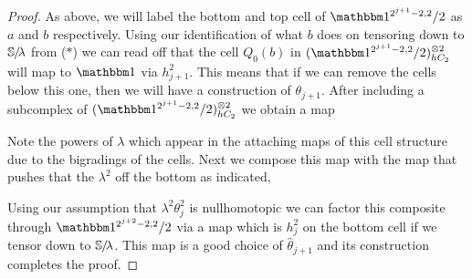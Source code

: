 \begin{proof}
  As above, we will label the bottom and top cell of $\o^{2^{j+1}-2,2}/2$ as $a$ and $b$ respectively.
  Using our identification of what $b$ does on tensoring down to $\operatorname{\mathbb{S}}\hspace{-2.2pt}/\!\lambda$ from ($*$) we can read off that the cell $Q_0(b)$ in $(\o^{2^{j+1}-2,2}/2)^{\otimes 2}_{hC_2}$ will map to $\o$ via $h_{j+1}^2$.
  This means that if we can remove the cells below this one, then we will have a construction of $\theta_{j+1}$.  
  After including a subcomplex of $(\o^{2^{j+1}-2,2}/2)^{\otimes 2}_{hC_2}$ we obtain a map
  \begin{center}  \end{center}
  Note the powers of $\lambda$ which appear in the attaching maps of this cell structure due to the bigradings of the cells. Next we compose this map with the map that pushes that the $\lambda^2$ off the bottom as indicated,
  \begin{center}  \end{center}
  Using our assumption that $\lambda^2\theta_j^2$ is nullhomotopic we can factor this composite through $\o^{2^{j+2}-2,2}/2$ via a map which is $h_j^2$ on the bottom cell if we tensor down to $\operatorname{\mathbb{S}}\hspace{-2.2pt}/\!\lambda$. This map is a good choice of $\widehat{\theta}_{j+1}$ and its construction completes the proof.
\end{proof}

